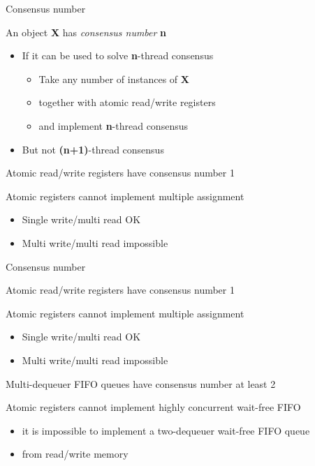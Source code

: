 \begin{frame}{Consensus number}

An object \textbf{X} has \textit{consensus number} \textbf{n}
\begin{itemize}
  \item If it can be used to solve \textbf{n}-thread consensus
  \begin{itemize}
    \item Take any number of instances of \textbf{X} 
    \item together with atomic read/write registers
    \item and implement \textbf{n}-thread consensus
  \end{itemize}
  \item But not \textbf{(n+1)}-thread consensus
\end{itemize}

\pause

\begin{theorem}
  Atomic read/write registers have consensus number 1
\end{theorem}

Atomic registers cannot implement multiple assignment
\begin{itemize}
  \item Single write/multi read OK
  \item Multi write/multi read impossible
\end{itemize}

\end{frame}


\begin{frame}{Consensus number}

\begin{theorem}
  Atomic read/write registers have consensus number 1
\end{theorem}

Atomic registers cannot implement  multiple assignment
\begin{itemize}
  \item Single write/multi read OK
  \item Multi write/multi read impossible
\end{itemize}

\pause
\pause

\begin{theorem}
Multi-dequeuer FIFO queues have consensus number at least 2
\end{theorem}

Atomic registers cannot implement highly concurrent wait-free FIFO
\begin{itemize}
  \item it is impossible to implement a two-dequeuer wait-free FIFO queue
  \item from read/write memory
\end{itemize}

\end{frame}

